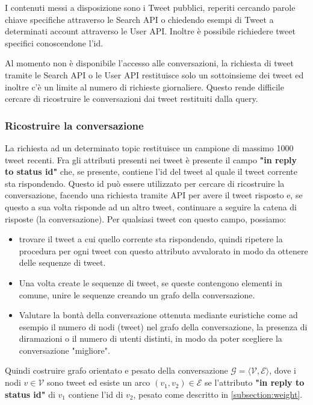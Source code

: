 I contenuti messi a disposizione sono i Tweet pubblici, reperiti cercando parole chiave specifiche attraverso le Search API o chiedendo esempi di Tweet a determinati account attraverso le User API. Inoltre è possibile richiedere tweet specifici conoscendone l'id.

Al momento non è disponibile l'accesso alle conversazioni, la richiesta di tweet tramite le Search API o le User API restituisce solo un sottoinsieme dei tweet ed inoltre c'è un limite al numero di richieste giornaliere. Questo rende difficile cercare di ricostruire le conversazioni dai tweet restituiti dalla query. 

\subsubsection{Ricostruire la conversazione}
\label{ricostruire-conv}
La richiesta ad un determinato topic restituisce un campione di massimo 1000 tweet recenti.
Fra gli attributi presenti nei tweet è presente il campo \textbf{"in reply to status id"} che, se presente, contiene l'id del tweet al quale il tweet corrente sta rispondendo. Questo id può essere utilizzato per cercare di ricostruire la conversazione, facendo una richiesta tramite API per avere il tweet risposto e, se questo a sua volta risponde ad un altro tweet, continuare a seguire la catena di risposte (la conversazione). Per qualsiasi tweet con questo campo, possiamo:
\begin{itemize}
    \item trovare il tweet a cui quello corrente sta rispondendo, quindi ripetere la procedura per ogni tweet con questo attributo avvalorato in modo da ottenere delle sequenze di tweet.
    \item Una volta create le sequenze di tweet, se queste contengono elementi in comune, unire le sequenze creando un grafo della conversazione.
    \item Valutare la bontà della conversazione ottenuta mediante euristiche come ad esempio il numero di nodi (tweet) nel grafo della conversazione, la presenza di diramazioni o il numero di utenti distinti, in modo da poter scegliere la conversazione "migliore".
\end{itemize}

Quindi costruire grafo orientato e pesato della conversazione $\mathcal{G = ⟨V, E⟩}$, dove i nodi $v \in \mathcal{V}$ sono tweet ed esiste un arco $(v_1,v_2) \in \mathcal{E}$ se l'attributo \textbf{"in reply to status id"} di $v_1$ contiene l'id di $v_2$, pesato come descritto in \ref{subsection:weight}.

